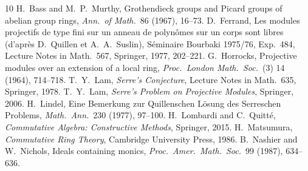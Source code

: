 \documentclass[11pt]{amsart}
\theoremstyle{remark}
\begin{document}
\begin{thebibliography}{10}
 H.~Bass and M.~P.~Murthy, Grothendieck groups and Picard groups
of abelian group rings, \emph{Ann.\ of Math.}\ 86 (1967), 16--73.
 D.~Ferrand, Les modules projectifs de type fini sur un anneau
de polyn\^omes sur un corps sont libres (d'apr\`es D.~Quillen et
A.~A.~Suslin), S\'eminaire Bourbaki 1975/76, Exp.~484, Lecture Notes in
Math.\ 567, Springer, 1977, 202--221.
 G.~Horrocks, Projective modules over an extension of a local
ring, \emph{Proc.\ London Math.\ Soc.}\ (3) 14 (1964), 714--718.
 T.~Y.~Lam, \emph{Serre's Conjecture}, Lecture Notes in
Math.\ 635, Springer, 1978.
 T.~Y.~Lam, \emph{Serre's Problem on Projective Modules},
Springer, 2006.
 H.~Lindel, Eine Bemerkung zur Quillenschen L\"osung des
Serreschen Problems, \emph{Math.\ Ann.}\ 230 (1977), 97--100.
 H.~Lombardi and C.~Quitt\'e, \emph{Commutative Algebra:
Constructive Methods}, Springer, 2015.
 H.~Matsumura, \emph{Commutative Ring Theory}, Cambridge
University Press, 1986.
 B.~Nashier and W.~Nichols, Ideals containing monics,
\emph{Proc.\ Amer.\ Math.\ Soc.}\ 99 (1987), 634--636.
\end{thebibliography}
\end{document}
